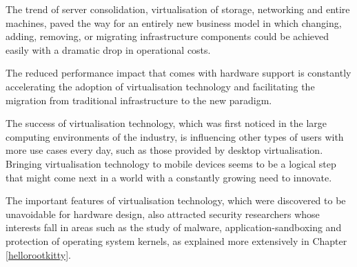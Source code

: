The trend of server consolidation, virtualisation of storage, networking and entire machines, paved the way for an entirely new business model in which changing, adding, removing, or migrating infrastructure components could be achieved easily with a dramatic drop in operational costs. %

The reduced performance impact that comes with hardware support is constantly accelerating the adoption of virtualisation technology and facilitating the migration from traditional infrastructure to the new paradigm.

The success of virtualisation technology, which was first noticed in the large computing environments of the industry, is influencing other types of users with more use cases every day, such as those provided by desktop virtualisation. %
Bringing virtualisation technology to mobile devices seems to be a logical step that might come next in a world with a constantly growing need to innovate. %

The important features of virtualisation technology, which were discovered to be unavoidable for hardware design, also attracted security researchers whose interests fall in areas such as the study of malware, application-sandboxing and protection of operating system kernels, as explained more extensively in Chapter \ref{hellorootkitty}.  %


